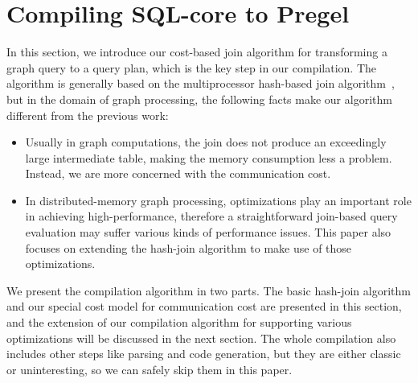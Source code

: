 \documentclass{sokendai_thesis} %
\begin{document}
\section{Compiling SQL-core to Pregel}
\label{sec:compilation}

In this section, we introduce our cost-based join algorithm for transforming a graph query to a query plan, which is the key step in our compilation.
The algorithm is generally based on the multiprocessor hash-based join algorithm~\cite{hashjoin-mp}, but
in the domain of graph processing, the following facts make our algorithm different from the previous work:
\begin{itemize}
\item
  Usually in graph computations, the join does not produce an exceedingly large intermediate table, making the memory consumption less a problem.
  Instead, we are more concerned with the communication cost. %
\item
  In distributed-memory graph processing, optimizations play an important role in achieving high-performance, therefore a straightforward join-based query evaluation may suffer various kinds of performance issues.
  This paper also focuses on extending the hash-join algorithm to make use of those optimizations.
\end{itemize}


We present the compilation algorithm in two parts.
The basic hash-join algorithm and our special cost model for communication cost are presented in this section, and the extension of our compilation algorithm for supporting various optimizations will be discussed in the next section.
The whole compilation also includes other steps like parsing and code generation, but they are either classic or  uninteresting, so we can safely skip them in this paper.
\end{document}
